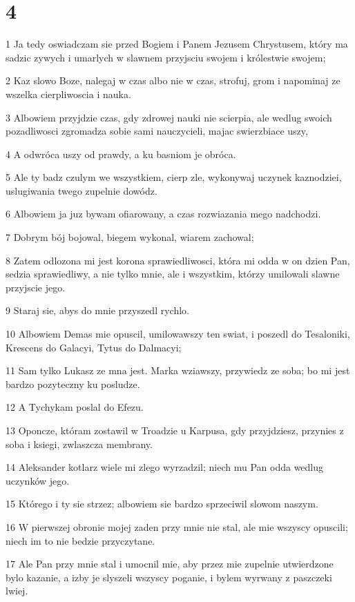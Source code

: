 \chapter{4}

\par 1 Ja tedy oswiadczam sie przed Bogiem i Panem Jezusem Chrystusem, który ma sadzic zywych i umarlych w slawnem przyjsciu swojem i królestwie swojem;
\par 2 Kaz slowo Boze, nalegaj w czas albo nie w czas, strofuj, grom i napominaj ze wszelka cierpliwoscia i nauka.
\par 3 Albowiem przyjdzie czas, gdy zdrowej nauki nie scierpia, ale wedlug swoich pozadliwosci zgromadza sobie sami nauczycieli, majac swierzbiace uszy,
\par 4 A odwróca uszy od prawdy, a ku basniom je obróca.
\par 5 Ale ty badz czulym we wszystkiem, cierp zle, wykonywaj uczynek kaznodziei, uslugiwania twego zupelnie dowódz.
\par 6 Albowiem ja juz bywam ofiarowany, a czas rozwiazania mego nadchodzi.
\par 7 Dobrym bój bojowal, biegem wykonal, wiarem zachowal;
\par 8 Zatem odlozona mi jest korona sprawiedliwosci, która mi odda w on dzien Pan, sedzia sprawiedliwy, a nie tylko mnie, ale i wszystkim, którzy umilowali slawne przyjscie jego.
\par 9 Staraj sie, abys do mnie przyszedl rychlo.
\par 10 Albowiem Demas mie opuscil, umilowawszy ten swiat, i poszedl do Tesaloniki, Krescens do Galacyi, Tytus do Dalmacyi;
\par 11 Sam tylko Lukasz ze mna jest. Marka wziawszy, przywiedz ze soba; bo mi jest bardzo pozyteczny ku posludze.
\par 12 A Tychykam poslal do Efezu.
\par 13 Oponcze, któram zostawil w Troadzie u Karpusa, gdy przyjdziesz, przynies z soba i ksiegi, zwlaszcza membrany.
\par 14 Aleksander kotlarz wiele mi zlego wyrzadzil; niech mu Pan odda wedlug uczynków jego.
\par 15 Którego i ty sie strzez; albowiem sie bardzo sprzeciwil slowom naszym.
\par 16 W pierwszej obronie mojej zaden przy mnie nie stal, ale mie wszyscy opuscili; niech im to nie bedzie przyczytane.
\par 17 Ale Pan przy mnie stal i umocnil mie, aby przez mie zupelnie utwierdzone bylo kazanie, a izby je slyszeli wszyscy poganie, i bylem wyrwany z paszczeki lwiej.
